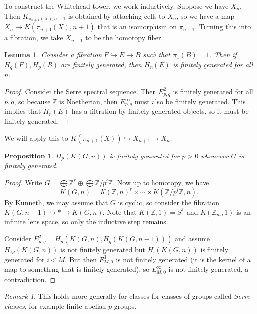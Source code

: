 \documentclass[leqno, openany]{memoir}
\newtheorem{prop}[thm]{Proposition}
\newtheorem{lem}[thm]{Lemma}
\theoremstyle{definition}
\theoremstyle{remark}
\newtheorem{rmk}[thm]{Remark}
\theoremstyle{plain}
\theoremstyle{definition}
\theoremstyle{remark}
\newcommand{\Z}{\mathbb{Z}}
\begin{document}
To construct the Whitehead tower, we work inductively. Suppose we have $X_n$. Then $K_{\pi_{n+1}(X), n+1}$ is obtained by attaching cells to $X_n$, so we have a map $X_n \to K(\pi_{n+1}(X), n+1)$ that is an isomorphism on $\pi_{n+1}$. Turning this into a fibration, we take $X_{n+1}$ to be the homotopy fiber.

\begin{lem}
    Consider a fibration $F \hookrightarrow E \to B$ such that $\pi_1(B) = 1$. Then if $H_q(F), H_p(B)$ are finitely generated, then $H_n(E)$ is finitely generated for all $n$.
\end{lem}

\begin{proof}
    Consider the Serre spectral sequence. Then $E_{p,q}^2$ is finitely generated for all $p,q$, so because $\Z$ is Noetherian, then $E_{p,q}^{\infty}$ must also be finitely generated. This implies that $H_n(E)$ has a filtration by finitely generated objects, so it must be finitely generated.
\end{proof}

We will apply this to $K(\pi_{n+1}(X)) \hookrightarrow X_{n+1} \to X_n$.

\begin{prop}
    $H_p(K(G, n))$ is finitely generated for $p>0$ whenever $G$ is finitely generated.
\end{prop}

\begin{proof}
    Write $G = \bigoplus \Z^r \oplus \bigoplus \Z/p^i \Z$. Now up to homotopy, we have
    \[ K(G, n) = {K(\Z, n)}^r \times \cdots \times K(\Z/p^i \Z, n). \]
    By K\"unneth, we may assume that $G$ is cyclic, so consider the fibration $K(G, n-1) \hookrightarrow * \to K(G,n)$. Note that $K(\Z,1) = S^1$ and $K(\Z_m,1)$ is an infinite lens space, so only the inductive step remains.

    Consider $E_{p,q}^2 = H_p(K(G,n), H_q(K(G, n-1)))$ and assume $H_M(K(G, n))$ is not finitely generated but $H_i(K(G, n))$ is finitely generated for $i < M$. But then $E_{M,0}^3$ is not finitely generated (it is the kernel of a map to something that is finitely generated), so $E_{M,0}^{\infty}$ is not finitely generated, a contradiction.
\end{proof}

\begin{rmk}
    This holds more generally for classes for classes of groups called \textit{Serre classes}, for example finite abelian $p$-groups.
\end{rmk}
\end{document}
